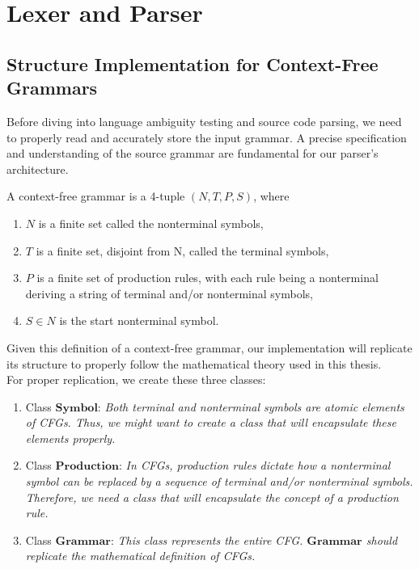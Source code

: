 \chapter{Lexer and Parser}\label{ch:Lexer and Parser}

\newpage


\section{Structure Implementation for Context-Free Grammars}\label{sec:Structure Implementation for Context-Free Grammars}

Before diving into language ambiguity testing and source code parsing, we need to properly read and accurately store the input grammar. A precise specification and understanding of the source grammar are fundamental for our parser’s architecture.\\

\begin{definition}[1.0]
    A context-free grammar is a 4-tuple \((N, T, P, S)\), where
    \begin{enumerate}
        \item \(N\) is a finite set called the nonterminal symbols,
        \item \(T\) is a finite set, disjoint from N, called the terminal symbols,
        \item \(P\) is a finite set of production rules, with each rule being a nonterminal deriving a string of terminal and/or nonterminal symbols,
        \item \(S \in N\) is the start nonterminal symbol.
    \end{enumerate}
\end{definition}
\setlength{\parindent}{0pt}

Given this definition of a context-free grammar, our implementation will replicate its structure to properly follow the mathematical theory used in this thesis.\\

For proper replication, we create these three classes:
\begin{enumerate}
    \item Class \(\boldsymbol{Symbol}\): \textit{Both terminal and nonterminal symbols are atomic elements of CFGs. Thus, we might want to create a class that will encapsulate these elements properly.}
    \item Class \(\boldsymbol{Production}\): \textit{In CFGs, production rules dictate how a nonterminal symbol can be replaced by a sequence of terminal and/or nonterminal symbols. Therefore, we need a class that will encapsulate the concept of a production rule.}
    \item Class \(\boldsymbol{Grammar}\): \textit{This class represents the entire CFG. \(\boldsymbol{Grammar}\) should replicate the mathematical definition of CFGs.}
\end{enumerate}

